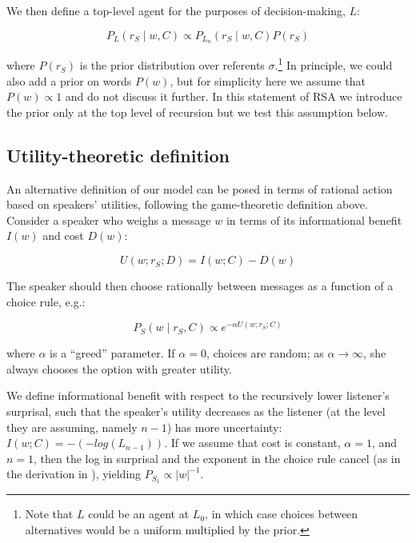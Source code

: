 \documentclass[man]{apa6}
\begin{document}
We then define a top-level agent for the purposes of decision-making, $L$:

\begin{equation}
P_L (r_S \mid w, C) \propto P_{L_n} (r_S \mid w, C) P(r_S)
\end{equation}

\noindent where $P(r_S)$ is the prior distribution over referents $\sigma$.\footnote{Note that $L$ could be an agent at $L_0$, in which case choices between alternatives would be a uniform multiplied by the prior.} In principle, we could also add a prior on words $P(w)$, but for simplicity here we assume that $P(w) \propto 1$ and do not discuss it further. In this statement of RSA we introduce the prior only at the top level of recursion but we test this assumption below.

\subsection{Utility-theoretic definition}

An alternative definition of our model can be posed in terms of rational action based on speakers' utilities, following the game-theoretic definition above. Consider a speaker who weighs a message $w$ in terms of its informational benefit $I(w)$ and cost $D(w)$:

\begin{equation}
U(w; r_S; D) = I(w; C) - D(w)
\end{equation}

\noindent The speaker should then choose rationally between messages as a function of a choice rule, e.g.:

\begin{equation}
P_S(w \mid r_S, C) \propto e^{-\alpha U(w;r_S; C)}
\end{equation}

\noindent where $\alpha$ is a ``greed'' parameter. If $\alpha=0$, choices are random; as $\alpha \rightarrow \infty$, she always chooses the option with greater utility.

We define informational benefit with respect to the recursively lower listener's surprisal, such that the speaker's utility decreases as the listener (at the level they are assuming, namely $n-1$) has more uncertainty: $I(w; C) = -(-log(L_{n-1}))$. If we assume that cost is constant, $\alpha=1$, and $n=1$, then the log in surprisal and the exponent in the choice rule cancel (as in the derivation in ), yielding $P_{S_1} \propto |w|^{-1}$.
\end{document}
